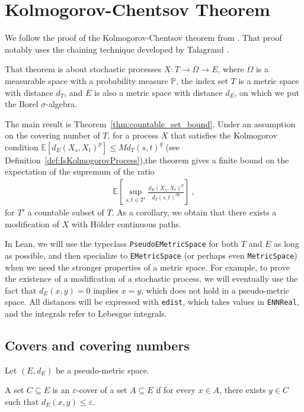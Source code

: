 \chapter{Kolmogorov-Chentsov Theorem}
\label{chap:kolmogorov_chentsov}

We follow the proof of the Kolmogorov-Chentsov theorem from \cite{kratschmer2023kolmogorov}.
That proof notably uses the chaining technique developed by Talagrand \cite{talagrand2022upper}.

That theorem is about stochastic processes $X : T \to \Omega \to E$, where $\Omega$ is a measurable space with a probability measure $\mathbb{P}$, the index set $T$ is a metric space with distance $d_T$, and $E$ is also a metric space with distance $d_E$, on which we put the Borel $\sigma$-algebra.

The main result is Theorem~\ref{thm:countable_set_bound}.
Under an assumption on the covering number of $T$, for a process $X$ that satisfies the Kolmogorov condition $\mathbb{E}[d_E(X_s, X_t)^p] \le M d_T(s, t)^q$ (see Definition~\ref{def:IsKolmogorovProcess}),the theorem gives a finite bound on the expectation of the supremum of the ratio
\begin{align*}
  \mathbb{E}\left[ \sup_{s, t \in T'} \frac{d_E(X_s, X_t)^p}{d_T(s, t)^{\beta p}} \right]
  \: ,
\end{align*}
for $T'$ a countable subset of $T$.
As a corollary, we obtain that there exists a modification of $X$ with Hölder continuous paths.

In Lean, we will use the typeclass \texttt{PseudoEMetricSpace} for both $T$ and $E$ as long as possible, and then specialize to \texttt{EMetricSpace} (or perhaps even \texttt{MetricSpace}) when we need the stronger properties of a metric space.
For example, to prove the existence of a modification of a stochastic process, we will eventually use the fact that $d_E(x, y) = 0$ implies $x = y$, which does not hold in a pseudo-metric space.
All distances will be expressed with \texttt{edist}, which takes values in \texttt{ENNReal}, and the integrals refer to Lebesgue integrals.

\section{Covers and covering numbers}

Let $(E, d_E)$ be a pseudo-metric space.

\begin{definition}\label{def:IsCover}
  \leanok
  A set $C \subseteq E$ is an $\varepsilon$-cover of a set $A \subseteq E$ if for every $x \in A$, there exists $y \in C$ such that $d_E(x, y) \le \varepsilon$.
\end{definition}



